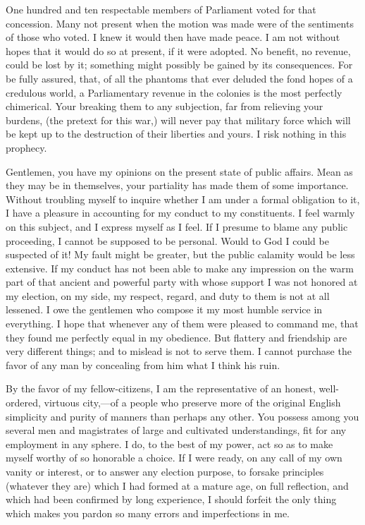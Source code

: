 One hundred and ten respectable members of Parliament voted for that concession. Many not present when the motion was made were of the sentiments of those who voted. I knew it would then have made peace. I am not without hopes that it would do so at present, if it were adopted. No benefit, no revenue, could be lost by it; something might possibly be gained by its consequences. For be fully assured, that, of all the phantoms that ever deluded the fond hopes of a credulous world, a Parliamentary revenue in the colonies is the most perfectly chimerical. Your breaking them to any subjection, far from relieving your burdens, (the pretext for this war,) will never pay that military force which will be kept up to the destruction of their liberties and yours. I risk nothing in this prophecy.

Gentlemen, you have my opinions on the present state of public affairs. Mean as they may be in themselves, your partiality has made them of some importance. Without troubling myself to inquire whether I am under a formal obligation to it, I have a pleasure in accounting for my conduct to my constituents. I feel warmly on this subject, and I express myself as I feel. If I presume to blame any public proceeding, I cannot be supposed to be personal. Would to God I could be suspected of it! My fault might be greater, but the public calamity would be less extensive. If my conduct has not been able to make any impression on the warm part of that ancient and powerful party with whose support I was not honored at my election, on my side, my respect, regard, and duty to them is not at all lessened. I owe the gentlemen who compose it my most humble service in everything. I hope that whenever any of them were pleased to command me, that they found me perfectly equal in my obedience. But flattery and friendship are very different things; and to mislead is not to serve them. I cannot purchase the favor of any man by concealing from him what I think his ruin.

By the favor of my fellow-citizens, I am the representative of an honest, well-ordered, virtuous city,—of a people who preserve more of the original English simplicity and purity of manners than perhaps any other. You possess among you several men and magistrates of large and cultivated understandings, fit for any employment in any sphere. I do, to the best of my power, act so as to make myself worthy of so honorable a choice. If I were ready, on any call of my own vanity or interest, or to answer any election purpose, to forsake principles (whatever they are) which I had formed at a mature age, on full reflection, and which had been confirmed by long experience, I should forfeit the only thing which makes you pardon so many errors and imperfections in me.

